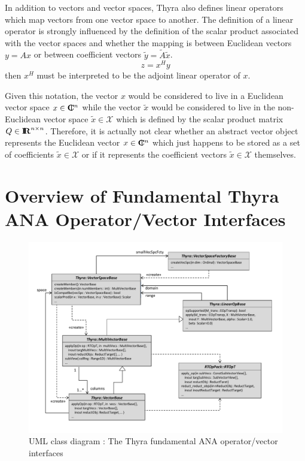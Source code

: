 \documentclass[11pt]{SANDreport}
\begin{document}
In addition to vectors and vector spaces, Thyra also defines linear operators which map vectors from one vector space to another.  The definition of a linear operator is strongly influenced by the definition of the scalar product associated with the vector spaces and whether the mapping is between Euclidean vectors $y = A x$ or between coefficient vectors $\tilde{y} = {}\tilde{A} {}\tilde{x}$. %
%
\begin{equation}
z = x^H y
\end{equation}
%
then $x^H$ must be interpreted to be the adjoint linear operator of $x$.

Given this notation, the vector $x$ would be considered to live in a Euclidean vector space $x\in\mbox{\textbf{C}}\hspace{-1.1ex}\mbox{l}\hspace{0.4ex}^n$ while the vector $\tilde{x}$ would be considered to live in the non-Euclidean vector space $\tilde{x}\in\mathcal{X}$ which is defined by the scalar product matrix $Q\in\mbox{\textbf{I}}\hspace{-0.6ex}\mbox{\textbf{R}}^{n\times{}n}$.  Therefore, it is actually not clear whether an abstract vector object represents the Euclidean vector $x\in\mbox{\textbf{C}}\hspace{-1.1ex}\mbox{l}\hspace{0.4ex}^n$ which just happens to be stored as a set of coefficients $\tilde{x}\in\mathcal{X}$ or if it represents the coefficient vectors $\tilde{x}\in\mathcal{X}$ themselves.


%
\section{Overview of Fundamental Thyra ANA Operator/Vector Interfaces}
\label{thyra:sec:Thyra_core_overview}
%

{\bsinglespace
\begin{figure}[p]
\begin{center}
\includegraphics*[scale=0.65]{ThyraANAOpVecInterfaces}
\end{center}
\caption{
\label{thyra:fig:basic_op_vec_itfc}
UML class diagram : The Thyra fundamental ANA operator/vector interfaces }
\end{figure}
\esinglespace}
\end{document}
